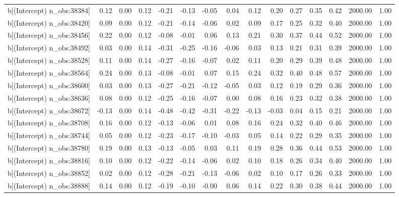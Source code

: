 \begin{table}[ht]
\begin{tabular}{rrrrrrrrrrrrrrr}
  b[(Intercept) n\_obs:38384] & 0.12 & 0.00 & 0.12 & -0.21 & -0.13 & -0.05 & 0.04 & 0.12 & 0.20 & 0.27 & 0.35 & 0.42 & 2000.00 & 1.00 \\ 
  b[(Intercept) n\_obs:38420] & 0.09 & 0.00 & 0.12 & -0.21 & -0.14 & -0.06 & 0.02 & 0.09 & 0.17 & 0.25 & 0.32 & 0.40 & 2000.00 & 1.00 \\ 
  b[(Intercept) n\_obs:38456] & 0.22 & 0.00 & 0.12 & -0.08 & -0.01 & 0.06 & 0.13 & 0.21 & 0.30 & 0.37 & 0.44 & 0.52 & 2000.00 & 1.00 \\ 
  b[(Intercept) n\_obs:38492] & 0.03 & 0.00 & 0.14 & -0.31 & -0.25 & -0.16 & -0.06 & 0.03 & 0.13 & 0.21 & 0.31 & 0.39 & 2000.00 & 1.00 \\ 
  b[(Intercept) n\_obs:38528] & 0.11 & 0.00 & 0.14 & -0.27 & -0.16 & -0.07 & 0.02 & 0.11 & 0.20 & 0.29 & 0.39 & 0.48 & 2000.00 & 1.00 \\ 
  b[(Intercept) n\_obs:38564] & 0.24 & 0.00 & 0.13 & -0.08 & -0.01 & 0.07 & 0.15 & 0.24 & 0.32 & 0.40 & 0.48 & 0.57 & 2000.00 & 1.00 \\ 
  b[(Intercept) n\_obs:38600] & 0.03 & 0.00 & 0.13 & -0.27 & -0.21 & -0.12 & -0.05 & 0.03 & 0.12 & 0.19 & 0.29 & 0.36 & 2000.00 & 1.00 \\ 
  b[(Intercept) n\_obs:38636] & 0.08 & 0.00 & 0.12 & -0.25 & -0.16 & -0.07 & 0.00 & 0.08 & 0.16 & 0.23 & 0.32 & 0.38 & 2000.00 & 1.00 \\ 
  b[(Intercept) n\_obs:38672] & -0.13 & 0.00 & 0.14 & -0.48 & -0.42 & -0.31 & -0.22 & -0.13 & -0.03 & 0.04 & 0.15 & 0.21 & 2000.00 & 1.00 \\ 
  b[(Intercept) n\_obs:38708] & 0.16 & 0.00 & 0.12 & -0.13 & -0.06 & 0.01 & 0.08 & 0.16 & 0.24 & 0.32 & 0.40 & 0.46 & 2000.00 & 1.00 \\ 
  b[(Intercept) n\_obs:38744] & 0.05 & 0.00 & 0.12 & -0.23 & -0.17 & -0.10 & -0.03 & 0.05 & 0.14 & 0.22 & 0.29 & 0.35 & 2000.00 & 1.00 \\ 
  b[(Intercept) n\_obs:38780] & 0.19 & 0.00 & 0.13 & -0.13 & -0.05 & 0.03 & 0.11 & 0.19 & 0.28 & 0.36 & 0.44 & 0.53 & 2000.00 & 1.00 \\ 
  b[(Intercept) n\_obs:38816] & 0.10 & 0.00 & 0.12 & -0.22 & -0.14 & -0.06 & 0.02 & 0.10 & 0.18 & 0.26 & 0.34 & 0.40 & 2000.00 & 1.00 \\ 
  b[(Intercept) n\_obs:38852] & 0.02 & 0.00 & 0.12 & -0.28 & -0.21 & -0.13 & -0.06 & 0.02 & 0.10 & 0.17 & 0.26 & 0.33 & 2000.00 & 1.00 \\ 
  b[(Intercept) n\_obs:38888] & 0.14 & 0.00 & 0.12 & -0.19 & -0.10 & -0.00 & 0.06 & 0.14 & 0.22 & 0.30 & 0.38 & 0.44 & 2000.00 & 1.00 \\ 

\end{tabular}
\end{table}
